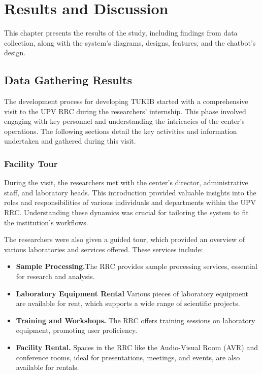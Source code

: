 \chapter{Results and Discussion}
This chapter presents the results of the study, including findings from data collection, along with the system's diagrams, designs, features, and the chatbot's design.

\section{Data Gathering Results}
The development process for developing TUKIB started with a comprehensive visit to the UPV RRC during the researchers' internship. This phase involved engaging with key personnel and understanding the intricacies of the center's operations. The following sections detail the key activities and information undertaken and gathered during this visit.

\subsection{Facility Tour}
During the visit, the researchers met with the center's director, administrative staff, and laboratory heads. This introduction provided valuable insights into the roles and responsibilities of various individuals and departments within the UPV RRC. Understanding these dynamics was crucial for tailoring the system to fit the institution's workflows.

The researchers were also given a guided tour, which provided an overview of various laboratories and services offered. These services include:

\begin{itemize}
	\item \textbf{Sample Processing.}The RRC provides sample processing services, essential for research and analysis.
	\item \textbf{Laboratory Equipment Rental} Various pieces of laboratory equipment are available for rent, which supports a wide range of scientific projects.
	\item \textbf{Training and Workshops.} The RRC offers training sessions on laboratory equipment, promoting user proficiency.
	\item \textbf{Facility Rental.} Spaces in the RRC like the Audio-Visual Room (AVR) and conference rooms, ideal for presentations, meetings, and events, are also available for rentals.
\end{itemize}

